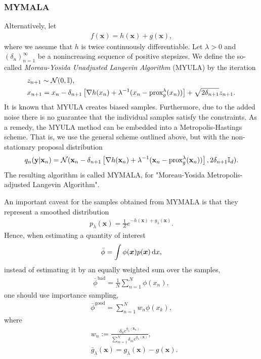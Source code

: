 \documentclass[10pt]{article}
\numberwithin{equation}{section}
\begin{document}
\subsubsection{MYMALA}

Alternatively, let
\begin{align*}
f(\bm x) = h(\bm x) + g(\bm x),
\end{align*}
where we assume that $h$ is twice continuously differentiable. Let $\lambda > 0$ and $(\delta_n)_{n=1}^\infty$ be a nonincreasing sequence of positive stepsizes. We define the so-called \emph{Moreau-Yosida Unadjusted Langevin Algorithm} (MYULA) by the iteration
\begin{align*}
& z_{n+1} \sim \mathcal{N}(0, \mathbb{I}), \\
& x_{n+1} = x_n - \delta_{n+1} \left[ \nabla h(x_n) + \lambda^{-1}( x_n - \text{prox}_{g}^{\lambda}(x_n)) \right] + \sqrt{2 \delta_{n+1}} z_{n+1}. \\
\end{align*}
It is known that MYULA creates biased samples. Furthermore, due to the added noise there is no guarantee that the individual samples satisfy the constraints. As a remedy, the MYULA method can be embedded into a Metropolis-Hastings scheme. That is, we use the general scheme outlined above, but with the non-stationary proposal distribution
\begin{align}
q_n(\mathbf{y} | \mathbf{x}_n) = \mathcal{N}(\mathbf{x}_n - \delta_{n+1}\left[ \nabla h(\mathbf{x}_n) + \lambda^{-1} ( \mathbf{x}_n - \text{prox}_{g}^{\lambda}(\mathbf{x}_n) )\right], 2 \delta_{n+1} \mathbb{I}_d). \label{eq:mymala_proposal}
\end{align}
The resulting algorithm is called MYMALA, for "Moreau-Yosida Metropolis-adjusted Langevin Algorithm".


An important caveat for the samples obtained from MYMALA is that they represent a smoothed distribution
\begin{align*}
p_\lambda(\bm x) = \frac{1}{Z} e^{-h(\bm x) + g_\lambda(\bm x)}.
\end{align*}
Hence, when estimating a quantity of interest
\begin{align*}
\bar \phi = \int \phi(\bm x) p(\bm x) \,\mathrm d x,
\end{align*}
instead of estimating it by an equally weighted sum over the samples,
\begin{align*}
\bar \phi^\text{bad} = \frac{1}{N} \sum_{n=1}^N \phi(x_n),
\end{align*}
one should use importance sampling,
\begin{align*}
\bar \phi^\text{good} = \sum_{n=1}^N w_n \phi(x_k),
\end{align*}
where
\begin{align*}
& w_n := \frac{\delta_n e^{\bar g_\lambda(\bm x_n)}}{\sum_{m=1}^N \delta_m e^{\bar g_\lambda(\bm x)}}, \\
& \bar g_\lambda(\bm x) = g_\lambda(\bm x) - g(\bm x).
\end{align*}
\end{document}
